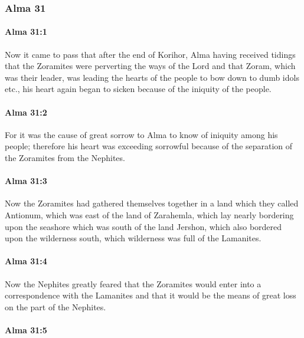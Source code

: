 	\subsubsection{Alma 31} %
		\label{ALMA-31}
		
		\paragraph{Alma 31:1} %
			\label{ALMA-31-1}

			Now it came to pass that after the end of Korihor,
			Alma having received tidings
			that the Zoramites were perverting the ways of the Lord
			and that Zoram, which was their leader, was leading the hearts of the people
			to bow down to dumb idols etc.,
			his heart again began to sicken because of the iniquity of the people.

		\paragraph{Alma 31:2} %
			\label{ALMA-31-2}

			For it was the cause of great sorrow to Alma to know of iniquity among his people;
			therefore his heart was exceeding sorrowful
			because of the separation of the Zoramites from the Nephites.

		\paragraph{Alma 31:3} %
			\label{ALMA-31-3}

			Now the Zoramites had gathered themselves together in a land
			which they called Antionum, which was east of the land of Zarahemla,
			which lay nearly bordering upon the seashore
			which was south of the land Jershon,
			which also bordered upon the wilderness south,
			which wilderness was full of the Lamanites.

		\paragraph{Alma 31:4} %
			\label{ALMA-31-4}

			Now the Nephites greatly feared
			that the Zoramites would enter into a correspondence with the Lamanites
			and that it would be the means of great loss on the part of the Nephites.

		\paragraph{Alma 31:5} %
			\label{ALMA-31-5}

